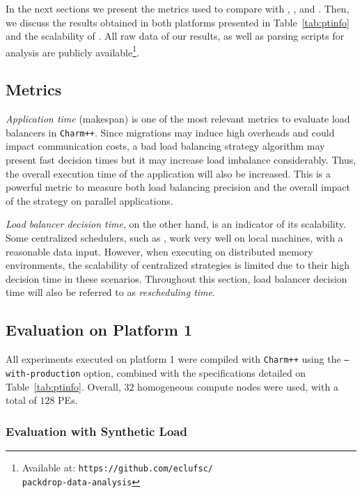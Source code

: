 In the next sections we present the metrics used to compare \packdrop with \greedylb, , \distributedlb and \dummylb.
Then, we discuss the results obtained in both platforms presented in Table~\ref{tab:ptinfo} and the scalability of \packdrop.
All raw data of our results, as well as parsing scripts for analysis are publicly available\footnote{Available at: \texttt{https://github.com/eclufsc/\\packdrop-data-analysis}}.

\subsection{Metrics}

\textit{Application time} (makespan) is one of the most relevant metrics to evaluate load balancers in \texttt{Charm++}.
Since migrations may induce high overheads and could impact communication costs, a bad load balancing strategy algorithm may present fast decision times but it may increase load imbalance considerably. Thus, the overall execution time of the application will also be increased.
This is a powerful metric to measure both load balancing precision and the overall impact of the strategy on parallel applications.

\textit{Load balancer decision time}, on the other hand, is an indicator of its scalability.
Some centralized schedulers, such as \greedylb, work very well on local machines, with a reasonable data input.
However, when executing on distributed memory environments, the scalability of centralized strategies is limited due to their high decision time in these scenarios.
Throughout this section, load balancer decision time will also be referred to as \textit{rescheduling time}.

\subsection{Evaluation on Platform 1} \label{sec:cluster}

All experiments executed on platform 1 were compiled with \texttt{Charm++} using the \texttt{--with-production} option, combined with the specifications detailed on Table~\ref{tab:ptinfo}.
Overall, $32$ homogeneous compute nodes were used, with a total of $128$ PEs.

\subsubsection{Evaluation with Synthetic Load} \label{sec:cluster:lbtest}

